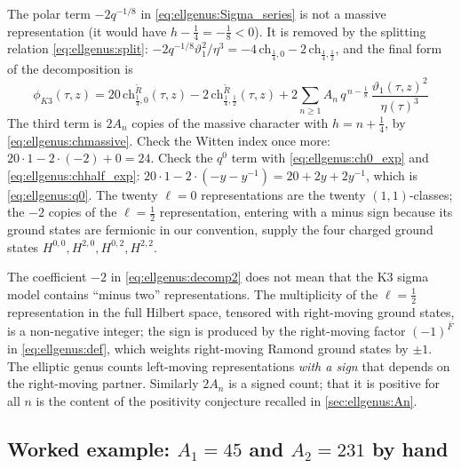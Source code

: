 The polar term $-2q^{-1/8}$ in \eqref{eq:ellgenus:Sigma_series} is not a massive
representation (it would have $h-\tfrac14=-\tfrac18<0$). It is removed by the splitting
relation \eqref{eq:ellgenus:split}: $-2q^{-1/8}\vartheta_1^2/\eta^3=-4\,\mathrm{ch}_{\frac14,0}
-2\,\mathrm{ch}_{\frac14,\frac12}$, and the final form of the decomposition is
\begin{equation}\label{eq:ellgenus:decomp2}
 \boxed{\;\phi_{K3}(\tau,z)=20\,\mathrm{ch}^{\tilde R}_{\frac14,0}(\tau,z)
 -2\,\mathrm{ch}^{\tilde R}_{\frac14,\frac12}(\tau,z)
 +2\sum_{n\ge1}A_n\,q^{\,n-\frac18}\,\frac{\vartheta_1(\tau,z)^2}{\eta(\tau)^3}\;}
\end{equation}
The third term is $2A_n$ copies of the massive character with $h=n+\tfrac14$, by
\eqref{eq:ellgenus:chmassive}. Check the Witten index once more: $20\cdot1-2\cdot(-2)+0=24$.
Check the $q^0$ term with \eqref{eq:ellgenus:ch0_exp} and \eqref{eq:ellgenus:chhalf_exp}:
$20\cdot1-2\cdot(-y-y^{-1})=20+2y+2y^{-1}$, which is \eqref{eq:ellgenus:q0}. The twenty
$\ell=0$ representations are the twenty $(1,1)$-classes; the $-2$ copies of the
$\ell=\tfrac12$ representation, entering with a minus sign because its ground states are
fermionic in our convention, supply the four charged ground states $H^{0,0},H^{2,0},H^{0,2},
H^{2,2}$.

\begin{pitfallbox}
The coefficient $-2$ in \eqref{eq:ellgenus:decomp2} does not mean that the K3 sigma model
contains ``minus two'' representations. The multiplicity of the $\ell=\tfrac12$
representation in the full Hilbert space, tensored with right-moving ground states, is a
non-negative integer; the sign is produced by the right-moving factor $(-1)^{\bar F}$ in
\eqref{eq:ellgenus:def}, which weights right-moving Ramond ground states by $\pm1$. The
elliptic genus counts left-moving representations \emph{with a sign} that depends on the
right-moving partner. Similarly $2A_n$ is a signed count; that it is positive for all $n$ is
the content of the positivity conjecture recalled in \cref{sec:ellgenus:An}.
\end{pitfallbox}

\subsection{Worked example: \texorpdfstring{$A_1=45$}{A1 = 45} and \texorpdfstring{$A_2=231$}{A2 = 231} by hand}\label{sec:ellgenus:worked2}

